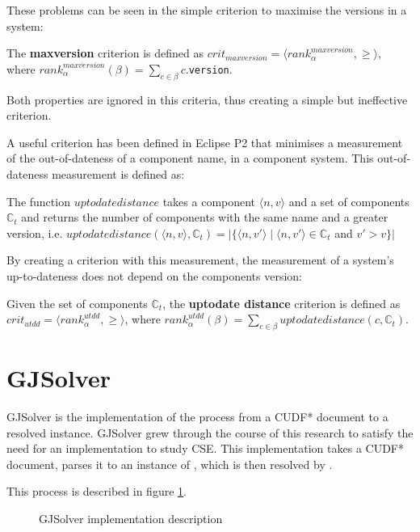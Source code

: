 These problems can be seen in the simple criterion to maximise the versions in a system:
\begin{defs}
	The \textbf{maxversion} criterion is defined as $crit_{maxversion} = \langle rank^{maxversion}_{\alpha}, \geq \rangle$,
	where $rank^{maxversion}_{\alpha}(\beta) = \sum_{c \in \beta} c.$\texttt{version}.
\end{defs}
Both properties are ignored in this criteria, thus creating a simple but ineffective criterion.

A useful criterion has been defined in Eclipse P2 that minimises a measurement of the out-of-dateness of a component name, in a component system.
This out-of-dateness measurement is defined as:
\begin{defs}
The function $uptodatedistance$ takes a component $\langle n, v \rangle$ and a set of components $\mathbb{C}_t$ and returns the number of components with the same name and a greater version,
i.e. $uptodatedistance(\langle n, v \rangle,\mathbb{C}_t) = |\{\langle n, v' \rangle \mid \langle n, v' \rangle \in \mathbb{C}_t $ and $ v' > v \}|$
\end{defs}

By creating a criterion with this measurement, the measurement of a system's up-to-dateness does not depend on the components version: 
\begin{defs}
	Given the set of components $\mathbb{C}_t$, the \textbf{uptodate distance} criterion is defined as $crit_{utdd} = \langle rank^{utdd}_{\alpha}, \geq \rangle$,
	where $rank^{utdd}_{\alpha}(\beta) = \sum_{c \in \beta} uptodatedistance(c,\mathbb{C}_t)$.
\end{defs}

\section{GJSolver}
\label{impl.gjsolver}
GJSolver is the implementation of the process from a CUDF* document to a resolved \modelname instance.
GJSolver grew through the course of this research to satisfy the need for an implementation to study CSE.
This implementation takes a CUDF* document, parses it to an instance of \modelname, which is then resolved by \modelimpl.

This process is described in figure \ref{impl.modelofgjsolver}.
\begin{figure}[htp]
\begin{center}
  \caption[labelInTOC]{GJSolver implementation description}
  \label{impl.modelofgjsolver}
\end{center}
\end{figure}

